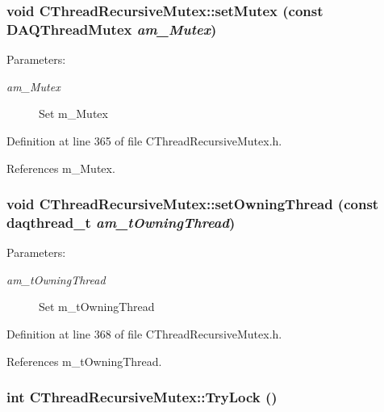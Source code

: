 \subsubsection{\setlength{\rightskip}{0pt plus 5cm}void CThread\-Recursive\-Mutex::set\-Mutex (const DAQThread\-Mutex {\em am\_\-Mutex})\hspace{0.3cm}{\tt  [inline, protected]}}\label{classCThreadRecursiveMutex_b0}


\begin{Desc}
\item[Parameters: ]\par
\begin{description}
\item[{\em 
am\_\-Mutex}]Set m\_\-Mutex \end{description}
\end{Desc}


Definition at line 365 of file CThread\-Recursive\-Mutex.h.

References m\_\-Mutex.
\subsubsection{\setlength{\rightskip}{0pt plus 5cm}void CThread\-Recursive\-Mutex::set\-Owning\-Thread (const daqthread\_\-t {\em am\_\-t\-Owning\-Thread})\hspace{0.3cm}{\tt  [inline, protected]}}\label{classCThreadRecursiveMutex_b1}


\begin{Desc}
\item[Parameters: ]\par
\begin{description}
\item[{\em 
am\_\-t\-Owning\-Thread}]Set m\_\-t\-Owning\-Thread \end{description}
\end{Desc}


Definition at line 368 of file CThread\-Recursive\-Mutex.h.

References m\_\-t\-Owning\-Thread.
\subsubsection{\setlength{\rightskip}{0pt plus 5cm}int CThread\-Recursive\-Mutex::Try\-Lock ()}\label{classCThreadRecursiveMutex_a8}


